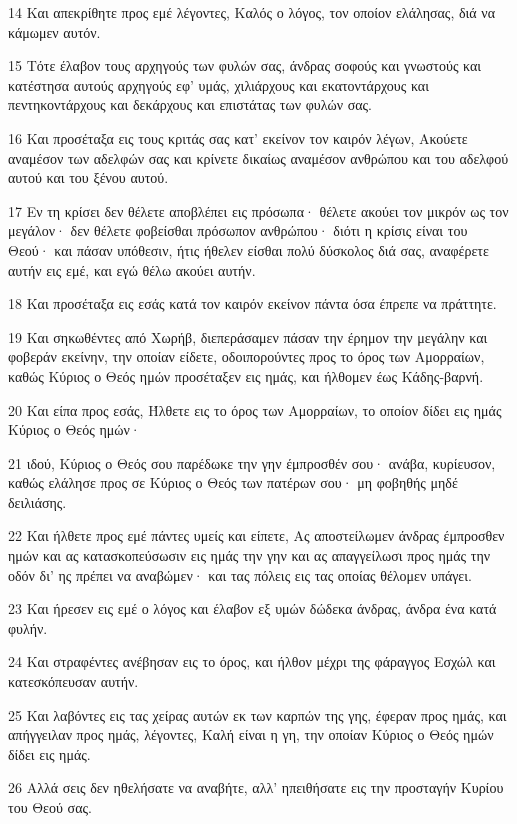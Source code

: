 \par 14 Και απεκρίθητε προς εμέ λέγοντες, Καλός ο λόγος, τον οποίον ελάλησας, διά να κάμωμεν αυτόν.
\par 15 Τότε έλαβον τους αρχηγούς των φυλών σας, άνδρας σοφούς και γνωστούς και κατέστησα αυτούς αρχηγούς εφ' υμάς, χιλιάρχους και εκατοντάρχους και πεντηκοντάρχους και δεκάρχους και επιστάτας των φυλών σας.
\par 16 Και προσέταξα εις τους κριτάς σας κατ' εκείνον τον καιρόν λέγων, Ακούετε αναμέσον των αδελφών σας και κρίνετε δικαίως αναμέσον ανθρώπου και του αδελφού αυτού και του ξένου αυτού.
\par 17 Εν τη κρίσει δεν θέλετε αποβλέπει εις πρόσωπα· θέλετε ακούει τον μικρόν ως τον μεγάλον· δεν θέλετε φοβείσθαι πρόσωπον ανθρώπου· διότι η κρίσις είναι του Θεού· και πάσαν υπόθεσιν, ήτις ήθελεν είσθαι πολύ δύσκολος διά σας, αναφέρετε αυτήν εις εμέ, και εγώ θέλω ακούει αυτήν.
\par 18 Και προσέταξα εις εσάς κατά τον καιρόν εκείνον πάντα όσα έπρεπε να πράττητε.
\par 19 Και σηκωθέντες από Χωρήβ, διεπεράσαμεν πάσαν την έρημον την μεγάλην και φοβεράν εκείνην, την οποίαν είδετε, οδοιπορούντες προς το όρος των Αμορραίων, καθώς Κύριος ο Θεός ημών προσέταξεν εις ημάς, και ήλθομεν έως Κάδης-βαρνή.
\par 20 Και είπα προς εσάς, Ήλθετε εις το όρος των Αμορραίων, το οποίον δίδει εις ημάς Κύριος ο Θεός ημών·
\par 21 ιδού, Κύριος ο Θεός σου παρέδωκε την γην έμπροσθέν σου· ανάβα, κυρίευσον, καθώς ελάλησε προς σε Κύριος ο Θεός των πατέρων σου· μη φοβηθής μηδέ δειλιάσης.
\par 22 Και ήλθετε προς εμέ πάντες υμείς και είπετε, Ας αποστείλωμεν άνδρας έμπροσθεν ημών και ας κατασκοπεύσωσιν εις ημάς την γην και ας απαγγείλωσι προς ημάς την οδόν δι' ης πρέπει να αναβώμεν· και τας πόλεις εις τας οποίας θέλομεν υπάγει.
\par 23 Και ήρεσεν εις εμέ ο λόγος και έλαβον εξ υμών δώδεκα άνδρας, άνδρα ένα κατά φυλήν.
\par 24 Και στραφέντες ανέβησαν εις το όρος, και ήλθον μέχρι της φάραγγος Εσχώλ και κατεσκόπευσαν αυτήν.
\par 25 Και λαβόντες εις τας χείρας αυτών εκ των καρπών της γης, έφεραν προς ημάς, και απήγγειλαν προς ημάς, λέγοντες, Καλή είναι η γη, την οποίαν Κύριος ο Θεός ημών δίδει εις ημάς.
\par 26 Αλλά σεις δεν ηθελήσατε να αναβήτε, αλλ' ηπειθήσατε εις την προσταγήν Κυρίου του Θεού σας.
